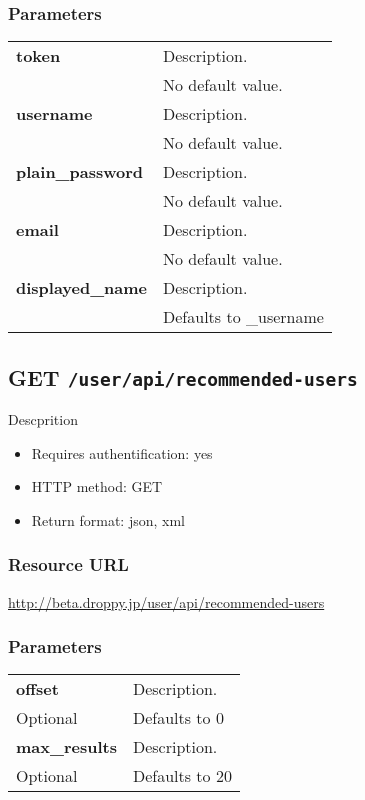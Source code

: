 \documentclass[11pt,a4paper]{article}
\newcommand{\content}[1]{\begin{minipage}{10cm}\vspace{2mm}#1\vspace{2mm}\end{minipage}}
\begin{document}
  \subsubsection*{Parameters}
  \begin{table}[h]
    \begin{center}
      \begin{tabular}{l l}
        \hline 
      \textbf{token} & \content{Description. }
      \\
       & No default value.\\
      \hline
      \textbf{username} & \content{Description. }
      \\
       & No default value.\\
      \hline
      \textbf{plain\_password} & \content{Description. }
      \\
       & No default value.\\
      \hline
      \textbf{email} & \content{Description. }
      \\
       & No default value.\\
      \hline
      \textbf{displayed\_name} & \content{Description. }
      \\
       & Defaults to \_username\\
      \hline
      \end{tabular}
    \end{center}
  \end{table}
  
      \newpage
      
      
  \subsection*{GET {\tt /user/api/recommended-users}}
  Descprition
  \begin{itemize}
  \item Requires authentification: yes
  \item HTTP method: GET
  \item Return format: json, xml
  \end{itemize}
  \subsubsection*{Resource URL}
  \url{http://beta.droppy.jp/user/api/recommended-users}
  \subsubsection*{Parameters}
  \begin{table}[h]
    \begin{center}
      \begin{tabular}{l l}
        \hline 
      \textbf{offset} & \content{Description. }
      \\
      Optional & Defaults to 0\\
      \hline
      \textbf{max\_results} & \content{Description. }
      \\
      Optional & Defaults to 20\\
      \hline
      \end{tabular}
    \end{center}
  \end{table}
  
\end{document}
